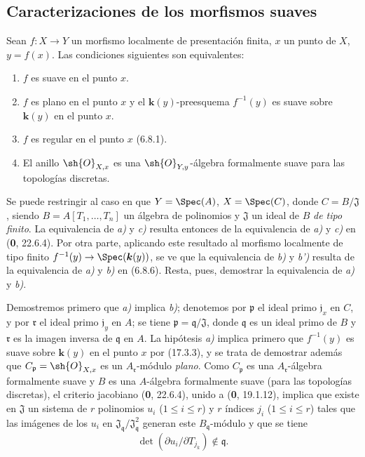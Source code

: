 \subsection{Caracterizaciones de los morfismos suaves}
\label{subsection:IV.17.5}

\begin{theorem}[17.5.1]
\label{IV.17.5.1}
Sean $f:X\to Y$ un morfismo localmente de presentación finita, $x$ un punto de $X$, $y=f(x)$. Las condiciones siguientes son equivalentes:
\begin{enumerate}
  \item[\textup{a)}] $f$ es suave en el punto $x$.
  \item[\textup{b)}] $f$ es plano en el punto $x$ y el $\boldsymbol{k}(y)$-preesquema $f^{-1}(y)$ es suave sobre $\boldsymbol{k}(y)$ en el punto $x$.
  \item[\textup{b$'$)}] $f$ es regular en el punto $x$ \textup{(6.8.1)}.
  \item[\textup{c)}] El anillo $\sh{O}_{X,x}$ es una $\sh{O}_{Y,y}$-álgebra formalmente suave para las topologías discretas.
\end{enumerate}
\end{theorem}

Se puede restringir al caso en que $Y=\Spec(A)$, $X=\Spec(C)$, donde $C=B/\mathfrak{J}$, siendo $B=A[T_1,\ldots,T_n]$ un álgebra de polinomios y $\mathfrak{J}$ un ideal de $B$ \emph{de tipo finito}. La equivalencia de \emph{a)} y \emph{c)} resulta entonces de la equivalencia de \emph{a)} y \emph{c)} en (\textbf 0, 22.6.4). Por otra parte, aplicando este resultado al morfismo localmente de tipo finito $f^{-1}(y)\to\Spec(\boldsymbol{k}(y))$, se ve que la equivalencia de \emph{b)} y \emph{b')} resulta de la equivalencia de \emph{a)} y \emph{b)} en (6.8.6). Resta, pues, demostrar la equivalencia de \emph{a)} y \emph{b)}.

Demostremos primero que \emph{a)} implica \emph{b)}; denotemos por $\mathfrak p$ el ideal primo $\mathfrak j_x$ en $C$, y por $\mathfrak r$ el ideal primo $\mathfrak j_y$ en $A$; se tiene $\mathfrak p=\mathfrak q/\mathfrak J$, donde $\mathfrak q$ es un ideal primo de $B$ y $\mathfrak r$ es la imagen inversa de $\mathfrak q$ en $A$. La hipótesis \emph{a)} implica primero que $f^{-1}(y)$ es suave sobre $\boldsymbol{k}(y)$ en el punto $x$ por (17.3.3), y se trata de demostrar además que $C_{\mathfrak p}=\sh{O}_{X,x}$ es un $A_{\mathfrak r}$-módulo \emph{plano}. Como $C_{\mathfrak p}$ es una $A_{\mathfrak r}$-álgebra formalmente suave y $B$ es una $A$-álgebra formalmente suave (para las topologías discretas), el criterio jacobiano (\textbf 0, 22.6.4), unido a (\textbf 0, 19.1.12), implica que existe en $\mathfrak J$ un sistema de $r$ polinomios $u_i$ ($1\leq i\leq r$) y $r$ índices $j_i$ ($1\leq i\leq r$) tales que las imágenes de los $u_i$ en $\mathfrak J_{\mathfrak q}/\mathfrak J_{\mathfrak q}^2$ generan este $B_{\mathfrak q}$-módulo y que se tiene
\[
\label{IV.17.5.1.1}
\det(\partial u_i/\partial T_{j_k})\notin\mathfrak q.
\tag{17.5.1.1}
\]

